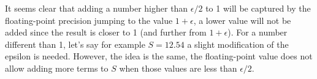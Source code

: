 It seems clear that adding a number higher than $\epsilon/2$ to 1
will be captured by the floating-point precision jumping to the value $1 + \epsilon$, a lower value will not be added
since the result is closer to 1 (and further from $1 + \epsilon$). For a number different than 1, let's say for example $S = 12.54$ a slight 
modification of the epsilon is needed. However, the idea is the same, the floating-point value does not allow 
adding more terms to $ S $ when those values are less than $\epsilon/2$. 






%
%
%
%
%
%




